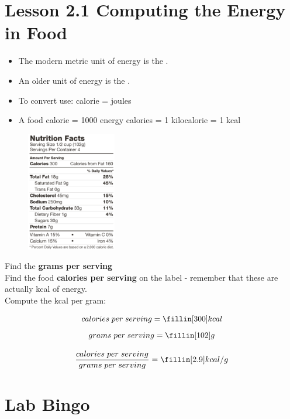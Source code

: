 \documentclass[answers,12pt]{exam}
\begin{document}
\section*{Lesson 2.1 Computing the Energy in Food}

\begin{itemize}
    \item The modern metric unit of energy is the \fillin[joule]. 
    \item An older unit of energy is the \fillin[calorie].
    \item To convert use: \fillin[1] calorie = \fillin[4.2] joules
    \item A food calorie = 1000 energy calories = 1 kilocalorie = 1 kcal
\end{itemize}
    

\begin{figure} %
    \centering
    \includegraphics[width=0.35\textwidth]{food_label.png}
\end{figure}


Find the \textbf{grams per serving} \\ 

Find the food \textbf{calories per serving} on the label - remember that these are actually kcal of energy. \\

Compute the kcal per gram:

$$ calories \; per \; serving = \fillin[300] kcal $$
$$ grams \; per \; serving = \fillin[102] g $$

$$ \frac{calories \; per \; serving}{grams \; per \; serving} = \fillin[2.9] kcal/g  $$

\vspace{1cm}

\newpage

\section*{Lab Bingo}
\end{document}
